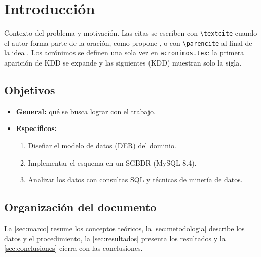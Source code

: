\section{Introducción}
\label{sec:introduccion}

Contexto del problema y motivación. Las citas se escriben con \verb|\textcite| cuando el
autor forma parte de la oración, como propone \textcite{codd1970}, o con \verb|\parencite|
al final de la idea \parencite{han2011, elmasri2016}. Los acrónimos se definen una sola vez
en \texttt{acronimos.tex}: la primera aparición de \ac{KDD} se expande y las siguientes
(\ac{KDD}) muestran solo la sigla.

\subsection{Objetivos}

\begin{itemize}
  \item \textbf{General:} qué se busca lograr con el trabajo.
  \item \textbf{Específicos:}
  \begin{enumerate}
    \item Diseñar el modelo de datos (\ac{DER}) del dominio.
    \item Implementar el esquema en un \ac{SGBDR} (MySQL 8.4).
    \item Analizar los datos con consultas \ac{SQL} y técnicas de minería de datos.
  \end{enumerate}
\end{itemize}

\subsection{Organización del documento}

La \cref{sec:marco} resume los conceptos teóricos, la \cref{sec:metodologia} describe los
datos y el procedimiento, la \cref{sec:resultados} presenta los resultados y la
\cref{sec:conclusiones} cierra con las conclusiones.

